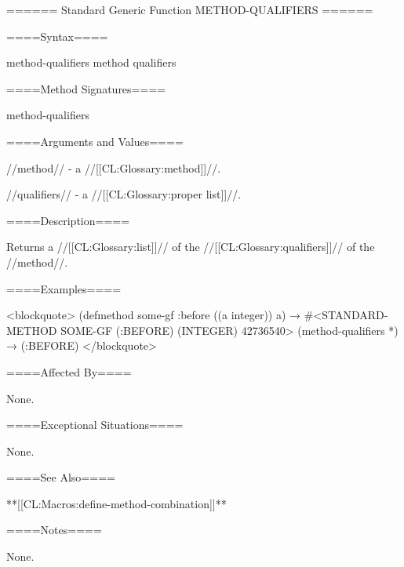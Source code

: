 ====== Standard Generic Function METHOD-QUALIFIERS ======

====Syntax====

\DefgenWithValues method-qualifiers {method} {qualifiers}

====Method Signatures====

\Defmeth method-qualifiers {}

====Arguments and Values====

//method// - a //[[CL:Glossary:method]]//.

//qualifiers// - a //[[CL:Glossary:proper list]]//.

====Description====

Returns a //[[CL:Glossary:list]]// of the //[[CL:Glossary:qualifiers]]// of the //method//.

====Examples====

<blockquote> (defmethod some-gf :before ((a integer)) a) → #<STANDARD-METHOD SOME-GF (:BEFORE) (INTEGER) 42736540> (method-qualifiers *) → (:BEFORE) </blockquote>

====Affected By====

None.

====Exceptional Situations====

None.

====See Also====

**[[CL:Macros:define-method-combination]]**

====Notes====

None.


